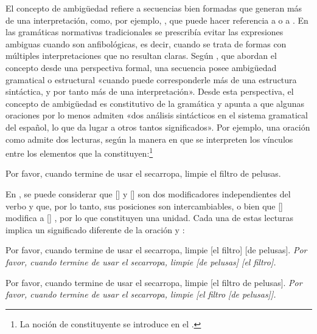 El concepto de ambigüedad refiere a secuencias bien formadas que generan más de
una interpretación, como, por ejemplo, , que puede hacer
referencia a  o a . En las
gramáticas normativas tradicionales se prescribía evitar las expresiones
ambiguas cuando son anfibológicas, es decir, cuando se trata de formas con
múltiples interpretaciones que no resultan claras. Según
\textcite[35]{bosque2009}, que abordan el concepto desde una perspectiva formal,
una secuencia posee ambigüedad gramatical o estructural «cuando puede
corresponderle más de una estructura sintáctica, y por tanto más de una
interpretación». Desde esta perspectiva, el concepto de ambigüedad es
constitutivo de la gramática y apunta a que algunas oraciones por lo menos
admiten «dos análisis sintácticos en el sistema gramatical del español, lo que
da lugar a otros tantos significados». Por ejemplo, una oración como
 admite dos lecturas, según la manera en que se
interpreten los vínculos entre los elementos que la constituyen:\footnote{La
noción de constituyente se introduce en el .}

\begin{exe}
  \ex\label{ex:02-secarropa} Por favor, cuando termine de usar el secarropa,
      limpie el filtro de pelusas.
\end{exe}

En , se puede considerar que [] y
[] son dos modificadores independientes del verbo
 y que, por lo tanto, sus posiciones son
intercambiables, o bien que [] modifica a []
, por lo que constituyen una unidad. Cada una de estas
lecturas implica un significado diferente de la oración
 y :

\begin{exe}
  \ex\label{ex:02-lectura1}
    \begin{xlist}
      \ex\label{ex:02-lectura1-a} Por favor, cuando termine de usar el
          secarropa, limpie [el filtro] [de pelusas].
      \ex\label{ex:02-lectura1-b} \textit{Por favor, cuando termine de usar el
          secarropa, limpie [de pelusas] [el filtro].}
    \end{xlist}
  \ex\label{ex:02-lectura2}
    \begin{xlist}
      \ex\label{ex:02-lectura2-a} Por favor, cuando termine de usar el
          secarropa, limpie [el filtro de pelusas].
      \ex\label{ex:02-lectura2-b} \textit{Por favor, cuando termine de usar el
          secarropa, limpie [el filtro [de pelusas]].}
    \end{xlist}
\end{exe}

